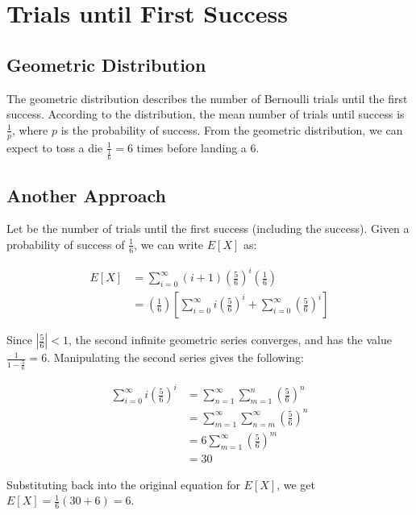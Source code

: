 \documentclass{article}
\date{}
\author{Kaan Aksoy | Feb 10, 2020}
\begin{document}
\maketitle

\section{Trials until First Success}
\subsection{Geometric Distribution}
The geometric distribution describes the number of 
Bernoulli trials until the first success. According to the 
distribution, the mean number of trials until success is 
$ \frac{1}{p}$, where $p$ is the probability of success. 
From the geometric distribution, we can expect to toss a 
die $\frac{1}{\frac{1}{6}} = 6$ times before landing a $6$.

\subsection{Another Approach}

Let  be the number of trials until the first success (including the success). Given a probability of 
success of $\frac{1}{6}$, we can write $E[X]$ as:

\begin{equation*}
\begin{split}
E[X] &=  \sum_{i=0}^{\infty} (i + 1)\left( \frac{5}{6} \right)^i \left( \frac{1}{6} \right) \\
&= \left( \frac{1}{6} \right) \left[ \sum_{i=0}^{\infty} i\left( \frac{5}{6} \right)^i +  \sum_{i=0}^{\infty} \left( \frac{5}{6} \right)^i \right]
\end{split}
\end{equation*}

Since $|\frac{5}{6}| < 1$, the second infinite geometric series converges, and has 
the value $\frac{1}{1 - \frac{5}{6}} = 6$. Manipulating the second series gives the 
following:

\begin{equation*}
\begin{split}
\sum_{i=0}^{\infty} i\left( \frac{5}{6} \right)^i &=
\sum_{n=1}^{\infty} \sum_{m=1}^{n} \left( \frac{5}{6} \right)^n \\ &= 
\sum_{m=1}^{\infty} \sum_{n=m}^{\infty} \left( \frac{5}{6} \right)^n \\ &= 
6 \sum_{m=1}^{\infty} \left( \frac{5}{6} \right)^m \\ &= 30
\end{split}
\end{equation*}

Substituting back into the original equation for $E[X]$, we get $E[X] = \frac{1}{6} \left( 30 + 6 \right) = 6$.
\end{document}
